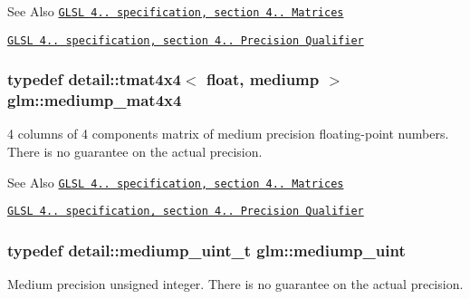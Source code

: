 \begin{DoxySeeAlso}{See Also}
\href{http://www.opengl.org/registry/doc/GLSLangSpec.4.20.8.pdf}{\tt G\-L\-S\-L 4.. specification, section 4.. Matrices} 

\href{http://www.opengl.org/registry/doc/GLSLangSpec.4.20.8.pdf}{\tt G\-L\-S\-L 4.. specification, section 4.. Precision Qualifier} 
\end{DoxySeeAlso}
\hypertarget{group__core__precision_gacb51d2d10f7607617ac544f6db9a6eef}{
\subsubsection[{mediump\-\_\-mat4x4}]{\setlength{\rightskip}{0pt plus 5cm}typedef detail\-::tmat4x4$<$ float, mediump $>$ {\bf glm\-::mediump\-\_\-mat4x4}}}\label{group__core__precision_gacb51d2d10f7607617ac544f6db9a6eef}
4 columns of 4 components matrix of medium precision floating-\/point numbers. There is no guarantee on the actual precision.

\begin{DoxySeeAlso}{See Also}
\href{http://www.opengl.org/registry/doc/GLSLangSpec.4.20.8.pdf}{\tt G\-L\-S\-L 4.. specification, section 4.. Matrices} 

\href{http://www.opengl.org/registry/doc/GLSLangSpec.4.20.8.pdf}{\tt G\-L\-S\-L 4.. specification, section 4.. Precision Qualifier} 
\end{DoxySeeAlso}
\hypertarget{group__core__precision_ga08ae38ad78ade3539fdd1d25052b8c51}{
\subsubsection[{mediump\-\_\-uint}]{\setlength{\rightskip}{0pt plus 5cm}typedef detail\-::mediump\-\_\-uint\-\_\-t {\bf glm\-::mediump\-\_\-uint}}}\label{group__core__precision_ga08ae38ad78ade3539fdd1d25052b8c51}
Medium precision unsigned integer. There is no guarantee on the actual precision.


